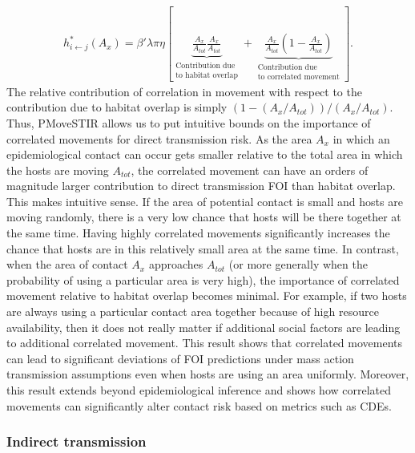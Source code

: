 \documentclass[letterpaper]{article}
\begin{document}
\begin{equation}
    \begin{aligned}
        h^*_{i \leftarrow j}(A_x) = \beta' \lambda \pi \eta \left[\underbrace{\frac{A_x}{A_{tot}}\frac{A_x}{A_{tot}}}_{\substack{\text{Contribution due} \\  \text{to habitat overlap}}} + \underbrace{\frac{A_x}{A_{tot}}(1 - \frac{A_x}{A_{tot}})}_{\substack{\text{Contribution due} \\ \text{to correlated movement}}} \right].
    \end{aligned}
    \label{eq:uniform_direct}
\end{equation}
The relative contribution of correlation in movement with respect to the contribution due to habitat overlap is simply $(1 - (A_x / A_{tot})) / (A_x / A_{tot})$. 
Thus, PMoveSTIR allows us to put intuitive bounds on the importance of correlated movements for direct transmission risk. 
As the area $A_x$ in which an epidemiological contact can occur gets smaller relative to the total area in which the hosts are moving $A_{tot}$, the correlated movement can have an orders of magnitude larger contribution to direct transmission FOI than habitat overlap. 
This makes intuitive sense. If the area of potential contact is small and hosts are moving randomly, there is a very low chance that hosts will be there together at the same time.  Having highly correlated movements significantly increases the chance that hosts are in this relatively small area at the same time.  
In contrast, when the area of contact $A_x$ approaches $A_{tot}$ (or more generally when the probability of using a particular area is very high), the importance of correlated movement relative to habitat overlap becomes minimal. For example, if two hosts are always using a particular contact area together because of high resource availability, then it does not really matter if additional social factors are leading to additional correlated movement. 
This result shows that correlated movements can lead to significant deviations of FOI predictions under mass action transmission assumptions even when hosts are using an area uniformly.  Moreover, this result extends beyond epidemiological inference and shows how correlated movements can significantly alter contact risk based on metrics such as CDEs.

\subsubsection*{Indirect transmission}
\end{document}
